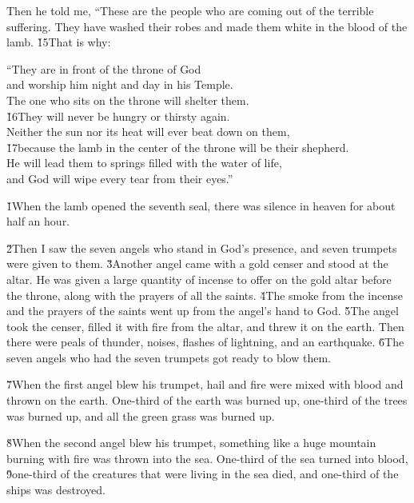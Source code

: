 Then he told me, ``These are the people who are coming out of the terrible suffering. They have washed their robes and made them white in the blood of the lamb. \v{15}That is why:

\begin{poetry}
\poeml ``They are in front of the throne of God \\
\poemll    and worship him night and day in his Temple. \\
\poeml The one who sits on the throne will shelter them. \\
\poeml \v{16}They will never be hungry or thirsty again. \\
\poemll    Neither the sun nor its heat will ever beat down on them, \\
\poeml \v{17}because the lamb in the center of the throne will be their shepherd. \\
\poemll    He will lead them to springs filled with the water of life, \\
\poemlll       and God will wipe every tear from their eyes.''
\end{poetry}

\v{1}When the lamb opened the seventh seal, there was silence in heaven for about half an hour.

\v{2}Then I saw the seven angels who stand in God's presence, and seven trumpets were given to them. \v{3}Another angel came with a gold censer and stood at the altar. He was given a large quantity of incense to offer on the gold altar before the throne, along with the prayers of all the saints. \v{4}The smoke from the incense and the prayers of the saints went up from the angel's hand to God. \v{5}The angel took the censer, filled it with fire from the altar, and threw it on the earth. Then there were peals of thunder, noises, flashes of lightning, and an earthquake. \v{6}The seven angels who had the seven trumpets got ready to blow them.

\v{7}When the first angel blew his trumpet, hail and fire were mixed with blood and thrown on the earth. One-third of the earth was burned up, one-third of the trees was burned up, and all the green grass was burned up.

\v{8}When the second angel blew his trumpet, something like a huge mountain burning with fire was thrown into the sea. One-third of the sea turned into blood, \v{9}one-third of the creatures that were living in the sea died, and one-third of the ships was destroyed.

